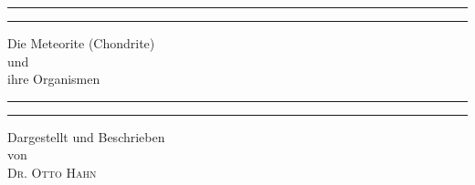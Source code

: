 \documentclass[a4paper, 11pt, oneside]{article}
\begin{document}
\frakfamily
\renewcommand{\contentsname}{
\frakfamily{Inhaltsverzeichnis}
}
\renewcommand{\listfigurename}{
\frakfamily{Abbildungsverzeichnis}
}
\let\origcftsecfont\cft
\let\origcftsecpagefont\cftsecpagefont
\let\origcftsecafterpnum\cftsecafterpnum
\renewcommand{\cftsecpagefont}{\frakfamily{\origcftsecpagefont}}
\renewcommand{\cftsecafterpnum}{\frakfamily{\origcftsecafterpnum}}
\let\origcftsubsecpagefont\cftsubsecpagefont
\let\origcftsubsecafterpnum\cftsubsecafterpnum
\renewcommand{\cftsubsecpagefont}{\frakfamily{\origcftsubsecpagefont}}
\renewcommand{\cftsubsecafterpnum}{\frakfamily{\origcftsubsecafterpnum}}

\begin{titlepage} %
	\centering %
	\scshape %

	
	\rule{\textwidth}{1.6pt}\vspace*{-\baselineskip}\vspace*{2pt} %
	\rule{\textwidth}{0.4pt} %
	
	\vspace{0.75\baselineskip} %
	
	{\LARGE Die Meteorite (Chondrite)\\ und\\ ihre Organismen\\} %
	
	\vspace{0.75\baselineskip} %
	
	\rule{\textwidth}{0.4pt}\vspace*{-\baselineskip}\vspace{3.2pt} %
	\rule{\textwidth}{1.6pt} %
	
	\vspace{1\baselineskip} %
	
	
	{Dargestellt und Beschrieben\\ von\\ \scshape\Large Dr. Otto Hahn\\} %
	

\end{titlepage}
\end{document}
